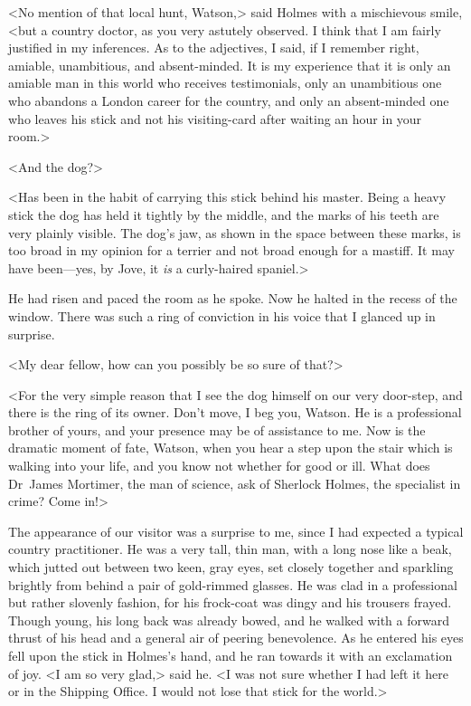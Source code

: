 <No mention of that local hunt, Watson,> said Holmes with a mischievous smile, <but a country doctor, as you very astutely observed. I think that I am fairly justified in my inferences. As to the adjectives, I said, if I remember right, amiable, unambitious, and absent-minded. It is my experience that it is only an amiable man in this world who receives testimonials, only an unambitious one who abandons a London career for the country, and only an absent-minded one who leaves his stick and not his visiting-card after waiting an hour in your room.>

<And the dog?>

<Has been in the habit of carrying this stick behind his master. Being a heavy stick the dog has held it tightly by the middle, and the marks of his teeth are very plainly visible. The dog's jaw, as shown in the space between these marks, is too broad in my opinion for a terrier and not broad enough for a mastiff. It may have been—yes, by Jove, it \emph{is} a curly-haired spaniel.>

He had risen and paced the room as he spoke. Now he halted in the recess of the window. There was such a ring of conviction in his voice that I glanced up in surprise.

<My dear fellow, how can you possibly be so sure of that?>

<For the very simple reason that I see the dog himself on our very door-step, and there is the ring of its owner. Don't move, I beg you, Watson. He is a professional brother of yours, and your presence may be of assistance to me. Now is the dramatic moment of fate, Watson, when you hear a step upon the stair which is walking into your life, and you know not whether for good or ill. What does Dr~James Mortimer, the man of science, ask of Sherlock Holmes, the specialist in crime? Come in!>

The appearance of our visitor was a surprise to me, since I had expected a typical country practitioner. He was a very tall, thin man, with a long nose like a beak, which jutted out between two keen, gray eyes, set closely together and sparkling brightly from behind a pair of gold-rimmed glasses. He was clad in a professional but rather slovenly fashion, for his frock-coat was dingy and his trousers frayed. Though young, his long back was already bowed, and he walked with a forward thrust of his head and a general air of peering benevolence. As he entered his eyes fell upon the stick in Holmes's hand, and he ran towards it with an exclamation of joy. <I am so very glad,> said he. <I was not sure whether I had left it here or in the Shipping Office. I would not lose that stick for the world.>

